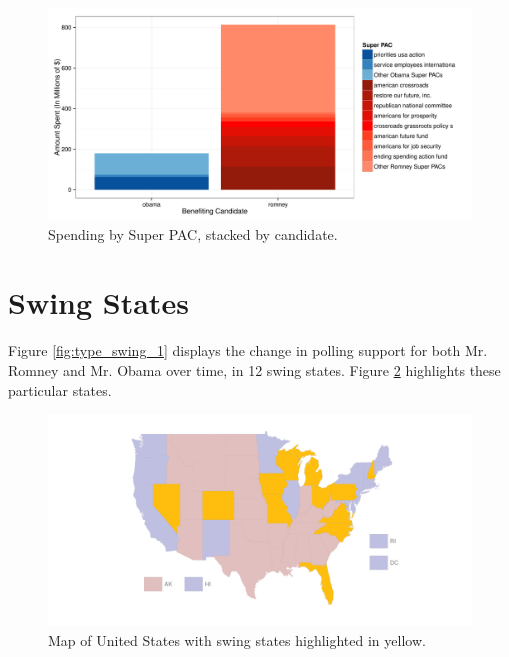 \documentclass[11pt]{article}\usepackage{graphicx, color}
\newenvironment{knitrout}{}{} %
\begin{document}
\begin{knitrout}
\color{fgcolor}\begin{figure}[H]


{\centering \includegraphics[width=\textwidth]{figure/PAC_plot} 

}

\caption[Spending by Super PAC, stacked by candidate]{Spending by Super PAC, stacked by candidate.\label{fig:PAC_plot}}
\end{figure}


\end{knitrout}


\section{Swing States}
Figure \ref{fig:type_swing_1} displays the change in polling support for both Mr. Romney and Mr. Obama over time, in 12 swing states. Figure \ref{fig:swing_map} highlights these particular states.

\begin{knitrout}
\color{fgcolor}\begin{figure}[H]


{\centering \includegraphics[width=\textwidth]{figure/swing_map} 

}

\caption[Map of United States with swing states highlighted in yellow]{Map of United States with swing states highlighted in yellow.\label{fig:swing_map}}
\end{figure}


\end{knitrout}
\end{document}
